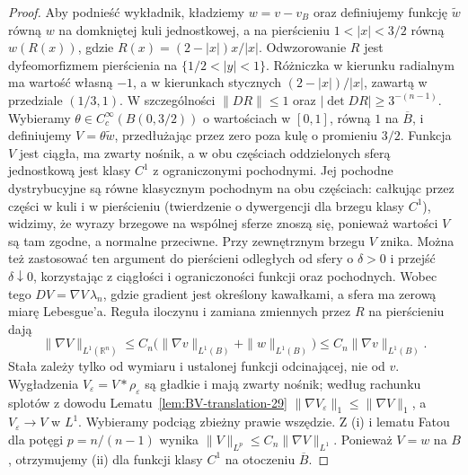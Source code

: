\begin{proof}
Aby podnieść wykładnik, kładziemy $w=v-v_B$
oraz definiujemy funkcję $\widetilde w$ równą $w$
na domkniętej kuli jednostkowej, a na pierścieniu
$1<|x|<3/2$ równą $w(R(x))$, gdzie
$R(x)=(2-|x|)x/|x|$. Odwzorowanie $R$ jest
dyfeomorfizmem pierścienia na $\{1/2<|y|<1\}$.
Różniczka w kierunku radialnym ma wartość własną
$-1$, a w kierunkach stycznych $(2-|x|)/|x|$,
zawartą w przedziale $(1/3,1)$. W szczególności
$\|DR\|\le1$ oraz $|\det DR|\ge3^{-(n-1)}$.
Wybieramy $\theta\in C_c^\infty(B(0,3/2))$
o wartościach w $[0,1]$, równą $1$ na $\overline B$,
i definiujemy $V=\theta\widetilde w$, przedłużając
przez zero poza kulę o promieniu $3/2$.
Funkcja $V$ jest ciągła, ma zwarty nośnik,
a w obu częściach oddzielonych sferą jednostkową
jest klasy $C^1$ z ograniczonymi pochodnymi.
Jej pochodne dystrybucyjne są równe klasycznym
pochodnym na obu częściach: całkując przez części
w kuli i w pierścieniu (twierdzenie o dywergencji
dla brzegu klasy $C^1$), widzimy, że wyrazy brzegowe
na wspólnej sferze znoszą się, ponieważ wartości
$V$ są tam zgodne, a normalne przeciwne.
Przy zewnętrznym brzegu $V$ znika.
Można też zastosować ten argument do pierścieni
odległych od sfery o $\delta>0$ i przejść
$\delta\downarrow0$, korzystając z ciągłości
i ograniczoności funkcji oraz pochodnych.
Wobec tego $DV=\nabla V\,\lambda_n$, gdzie
gradient jest określony kawałkami, a sfera
ma zerową miarę Lebesgue'a.
Reguła iloczynu i zamiana zmiennych przez $R$
na pierścieniu dają
\[
 \|\nabla V\|_{L^1(\mathbb R^n)}
 \le C_n\bigl(\|\nabla v\|_{L^1(B)}+\|w\|_{L^1(B)}\bigr)
 \le C_n\|\nabla v\|_{L^1(B)}.
\]
Stała zależy tylko od wymiaru i ustalonej funkcji
odcinającej, nie od $v$.
Wygładzenia $V_\varepsilon=V*\rho_\varepsilon$
są gładkie i mają zwarty nośnik; według rachunku
splotów z dowodu Lematu~\ref{lem:BV-translation-29}
$\|\nabla V_\varepsilon\|_1\le\|\nabla V\|_1$,
a $V_\varepsilon\to V$ w $L^1$.
Wybieramy podciąg zbieżny prawie wszędzie.
Z (i) i lematu Fatou dla potęgi $p=n/(n-1)$
wynika $\|V\|_{L^p}\le C_n\|\nabla V\|_{L^1}$.
Ponieważ $V=w$ na $B$, otrzymujemy (ii) dla
funkcji klasy $C^1$ na otoczeniu $\overline B$.


\end{proof}
